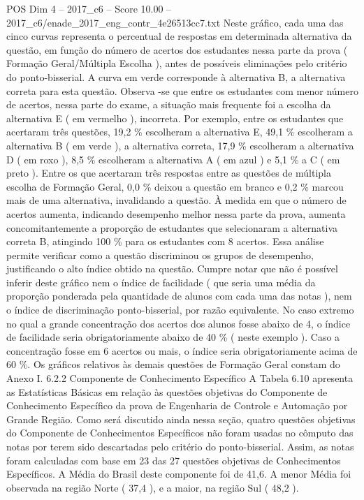 \begin{textsample}{POS Dim 4 – 2017\_c6 – Score 10.00 – 2017\_c6/enade\_2017\_eng\_contr\_4e26513cc7.txt}
Neste gráfico, cada uma das cinco curvas representa o percentual de respostas em determinada alternativa da questão, em função do número de acertos dos estudantes nessa parte da prova ( Formação Geral/Múltipla Escolha ), antes de possíveis eliminações pelo critério do ponto-bisserial.
A curva em verde corresponde à alternativa B, a alternativa correta para esta questão.
Observa -se que entre os estudantes com menor número de acertos, nessa parte do exame, a situação mais frequente foi a escolha da alternativa E ( em vermelho ), incorreta.
Por exemplo, entre os estudantes que acertaram três questões, 19,2 \% escolheram a alternativa E, 49,1 \% escolheram a alternativa B ( em verde ), a alternativa correta, 17,9 \% escolheram a alternativa D ( em roxo ), 8,5 \% escolheram a alternativa A ( em azul ) e 5,1 \% a C ( em preto ).
Entre os que acertaram três respostas entre as questões de múltipla escolha de Formação Geral, 0,0 \% deixou a questão em branco e 0,2 \% marcou mais de uma alternativa, invalidando a questão.
À medida em que o número de acertos aumenta, indicando desempenho melhor nessa parte da prova, aumenta concomitantemente a proporção de estudantes que selecionaram a alternativa correta B, atingindo 100 \% para os estudantes com 8 acertos.
Essa análise permite verificar como a questão discriminou os grupos de desempenho, justificando o alto índice obtido na questão.
Cumpre notar que não é possível inferir deste gráfico nem o índice de facilidade ( que seria uma média da proporção ponderada pela quantidade de alunos com cada uma das notas ), nem o índice de discriminação ponto-bisserial, por razão equivalente.
No caso extremo no qual a grande concentração dos acertos dos alunos fosse abaixo de 4, o índice de facilidade seria obrigatoriamente abaixo de 40 \% ( neste exemplo ).
Caso a concentração fosse em 6 acertos ou mais, o índice seria obrigatoriamente acima de 60 \%.
Os gráficos relativos às demais questões de Formação Geral constam do Anexo I. 6.2.2 Componente de Conhecimento Específico A Tabela 6.10 apresenta as Estatísticas Básicas em relação às questões objetivas do Componente de Conhecimento Específico da prova de Engenharia de Controle e Automação por Grande Região.
Como será discutido ainda nessa seção, quatro questões objetivas do Componente de Conhecimentos Específicos não foram usadas no cômputo das notas por terem sido descartadas pelo critério do ponto-bisserial.
Assim, as notas foram calculadas com base em 23 das 27 questões objetivas de Conhecimentos Específicos.
A Média do Brasil deste componente foi de 41,6.
A menor Média foi observada na região Norte ( 37,4 ), e a maior, na região Sul ( 48,2 ).

\end{textsample}
